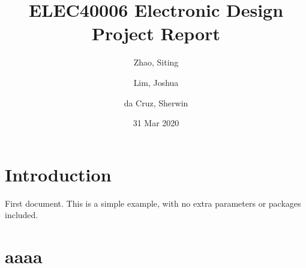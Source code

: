 \documentclass{report}
\title{ELEC40006 Electronic Design Project Report}
\author{
Zhao, Siting
\and
Lim, Joshua
\and
da Cruz, Sherwin
}
\date{31 Mar 2020}
\begin{document}
\maketitle

\tableofcontents

\begin{abstract}
\end{abstract}


\section{Introduction}

First document. This is a simple example, with no 
extra parameters or packages included.

\section{aaaa}
\end{document}
